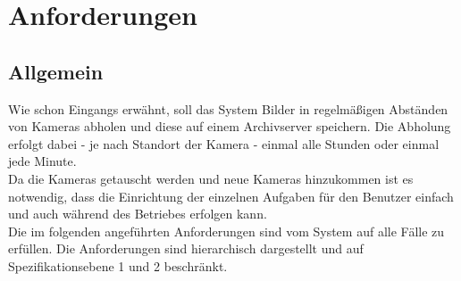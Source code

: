 \section{Anforderungen}\label{chap:Anforderungen}
\subsection{Allgemein}
Wie schon Eingangs erwähnt, soll das System Bilder in regelmäßigen Abständen von Kameras abholen und diese auf einem Archivserver speichern. Die Abholung erfolgt dabei - je nach Standort der Kamera - einmal alle Stunden oder einmal jede Minute.\\
Da die Kameras getauscht werden und neue Kameras hinzukommen ist es notwendig, dass die Einrichtung der einzelnen Aufgaben für den Benutzer einfach und auch während des Betriebes erfolgen kann.\\
Die im folgenden angeführten Anforderungen sind vom System auf alle Fälle zu erfüllen. Die Anforderungen sind hierarchisch dargestellt und auf Spezifikationsebene 1 und 2 beschränkt\parencite[S. 45]{rupp2009}.
